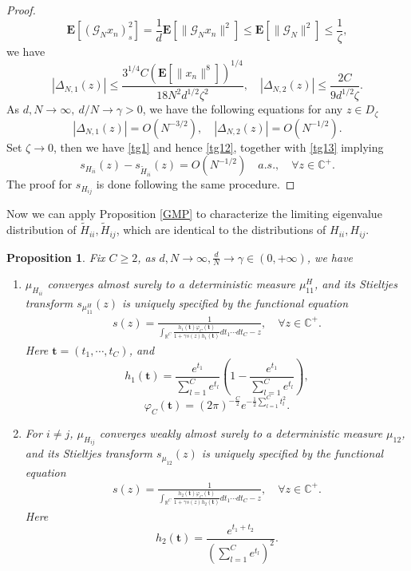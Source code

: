 \documentclass{article}
\newcommand{\E}{\mathbf{E}}
\newcommand{\mb}{\mathbb}
\newcommand{\ga}{\gamma}
\newcommand\mf{\mathbf}
\newcommand\ml{\mathcal}
\newcommand{\wt}{\widetilde}
\newcommand{\rw}{\rightarrow}
\newcommand{\1}{^{(1)}}
\newcommand{\2}{^{(2)}}
\renewcommand{\l}{\left}
\renewcommand{\r}{\right}
\newtheorem{prop}{Proposition}
\newcommand{\bea}{\begin{equation}\begin{aligned}}
\newcommand{\eea}{\end{aligned}\end{equation}}
\begin{document}
\begin{proof}
$$\E[(\ml{G}_Nx_n)_s^2]=\frac{1}{d}\E[\|\ml{G}_Nx_n\|^2] \leq \E[\|\ml{G}_N\|^2]  \leq  \frac{1}{\zeta},$$
we have
    $$
    |\Delta_{N,1}(z)|\leq \frac{3^{1/4}C\l(\E[\|x_n\|^8]\r)^{1/4}}{18N^2d^{1/2}\zeta^2},\quad |\Delta_{N,2}(z)|\leq \frac{2C}{9d^{1/2}\zeta}.
    $$
    As $d,N\rw\infty,\ d/N\rw \ga>0$, we have the following equations for any $z \in D_\zeta$
    $$
    |\Delta_{N,1}(z)|=O\l(N^{-3/2}\r),\quad |\Delta_{N,2}(z)|=O\l(N^{-1/2}\r).
    $$
    Set $\zeta \rightarrow 0$, then we have \eqref{tg1} and hence \eqref{tg12}, together with \eqref{tg13} implying
    $$
    s_{H_{ii}}(z)-s_{\wt{H}_{ii}}(z)=O\l(N^{-1/2}\r)\quad a.s.,\quad \forall z \in \mb{C}^+.
    $$
 The proof for $s_{H_{ij}}$ is done following the same procedure.
    
\end{proof}
Now we can apply Proposition \ref{GMP} to characterize the limiting eigenvalue distribution of $\widetilde{H}_{ii},\widetilde{H}_{ij}$, which are identical to the distributions of $H_{ii},H_{ij}$.
\begin{prop}\label{Linear_CE_MP}
    Fix $C\geq 2$, as $d,N\rw\infty, \frac
    {d}{N}\rw \gamma\in (0,+\infty)$, we have
    \begin{enumerate}
        \item $\mu_{H_{ii}}$  converges almost surely to a deterministic measure  $\mu^H_{11}$, and its Stieltjes transform  $s_{\mu^H_{11}}(z)$ is uniquely specified by the functional equation
        \bea\label{eqhii}
        s(z)=\frac{1}{\int_{\mb{R}^C} \frac{h_1(\mf{t})\varphi_C(\mf{t})}{1+\gamma s(z)h_1(\mf{t})}
 dt_1\cdots dt_C-z},\quad \forall z\in \mb{C}^+.
        \eea
        Here $\mf{t}=(t_1,\cdots,t_C)$, and 
        $$
        h_1(\mf{t})=\frac{e^{t_1}}{\sum_{l=1}^C e^{t_l}}\l(1-\frac{e^{t_1}}{\sum_{l=1}^C e^{t_l}}\r),
        $$
        $$
        \varphi_C(\mf{t})=(2\pi)^{-\frac{C}{2}}e^{-\frac{1}{2}\sum_{l=1}^Ct_l^2}.
        $$
        \item For $i\ne j$, $\mu_{H_{ij}}$ converges weakly almost surely to a deterministic measure $\mu_{12}$, and its Stieltjes transform  $s_{\mu_{12}}(z)$ is uniquely specified by the functional equation
        \bea\label{eqhij}
        s(z)=\frac{1}{\int_{\mb{R}^C} \frac{h_2(\mf{t})\varphi_C(\mf{t})}{1+\gamma s(z)h_2(\mf{t})}
 dt_1\cdots dt_C-z},\quad \forall z\in \mb{C}^+.
        \eea
        Here 
        $$
        h_2(\mf{t})=\frac{e^{t_1+t_2}}{\l(\sum_{l=1}^C e^{t_l}\r)^2}.
        $$
    \end{enumerate}
\end{prop}
\end{document}
